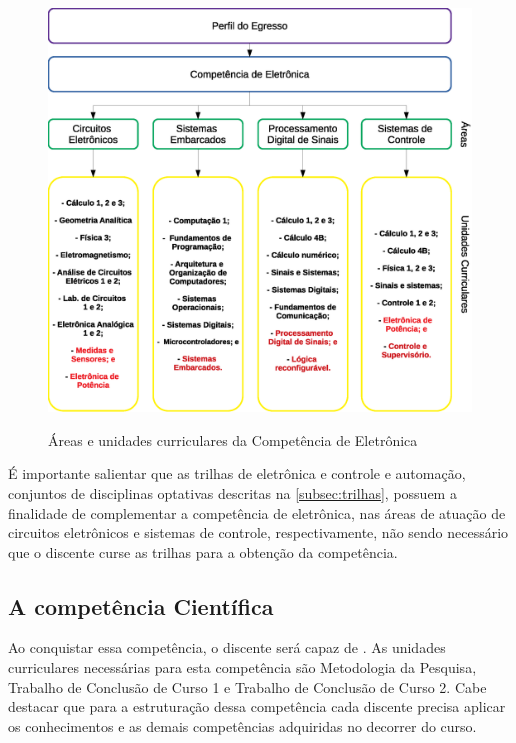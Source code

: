 \begin{figure}[!htb]
    \centering
    \caption[Áreas e unidades curriculares da Competência de Eletrônica]{Áreas e unidades curriculares da Competência de Eletrônica}
    \includegraphics[width=1.0\textwidth]{Caps/Figs/comp_eletronica.eps}
    \fonte{\utf}
    \label{fig:copele}
\end{figure}

É importante salientar que as trilhas de eletrônica e controle e automação, conjuntos de disciplinas optativas descritas na \autoref{subsec:trilhas}, possuem a finalidade de complementar a competência de eletrônica, nas áreas de atuação de circuitos eletrônicos e sistemas de controle, respectivamente, não sendo necessário que o discente curse as trilhas para a obtenção da competência.

\subsection{A competência Científica}

Ao conquistar essa competência, o discente será capaz de \textbf{\compCien}. As unidades curriculares necessárias para esta competência são Metodologia da Pesquisa, Trabalho de Conclusão de Curso 1 e Trabalho de Conclusão de Curso 2. Cabe destacar que para a estruturação dessa competência cada discente precisa aplicar os conhecimentos e as demais competências adquiridas no decorrer do curso.

